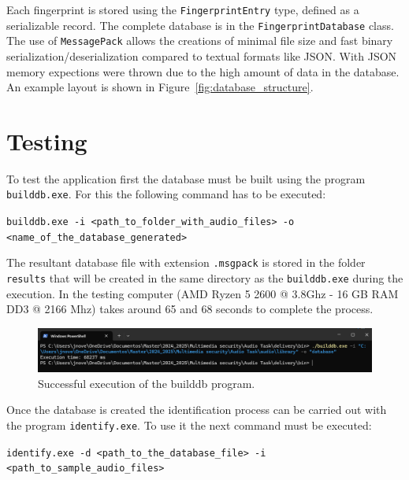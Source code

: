 \documentclass[11pt, a4paper]{article}
\begin{document}
    Each fingerprint is stored using the \texttt{FingerprintEntry} type, defined as a serializable record. The complete database is in the \texttt{FingerprintDatabase} class.
    The use of \texttt{MessagePack} allows the creations of minimal file size and fast binary serialization/deserialization compared to textual formats like JSON. With JSON memory expections
    were thrown due to the high amount of data in the database. An example layout is shown in Figure~\ref{fig:database_structure}.

    \newpage

    \section{Testing}

    To test the application first the database must be built using the program \texttt{builddb.exe}. For this the following command has to be executed:

    \vspace{1em} \texttt{builddb.exe -i <path\_to\_folder\_with\_audio\_files> -o <name\_of\_the\_database\_generated>}

    \vspace{1em} The resultant database file with extension \texttt{.msgpack} is stored in the folder \texttt{results} that will be created in the same directory as the \texttt{builddb.exe} during the execution. 
    In the testing computer (AMD Ryzen 5 2600 @ 3.8Ghz - 16 GB RAM DD3 @ 2166 Mhz) takes around 65 and 68 seconds to complete the process.

    \begin{figure}[H]
        \centering
        \includegraphics[width=\textwidth]{media/buildb_execution.png}
        \caption{Successful execution of the builddb program.}
        \label{fig:buildb_execution}
    \end{figure}

    Once the database is created the identification process can be carried out with the program \texttt{identify.exe}. To use it the next command must be executed:

    \vspace{1em} \texttt{identify.exe -d <path\_to\_the\_database\_file> -i <path\_to\_sample\_audio\_files>}
\end{document}

